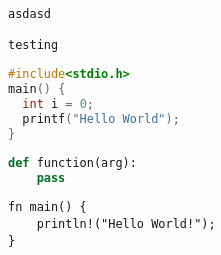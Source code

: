 \documentclass{article}
\begin{document}


\lstinline|asdasd|

\begin{lstlisting}
testing
\end{lstlisting}

\begin{lstlisting}[directivestyle={\color{black}},
                   language=C,
                   emph={int,char,double,float,unsigned},
                   emphstyle={\color{blue}}]
#include<stdio.h>
main() {
  int i = 0;
  printf("Hello World");
}
\end{lstlisting}

\begin{lstlisting}[language=python]
def function(arg):
    pass
\end{lstlisting}

\lstset{language=rust,numbers=none}
\begin{lstlisting}
fn main() {
    println!("Hello World!");
}
\end{lstlisting}

\lstset{language=x,numbers=none}
\end{document}
